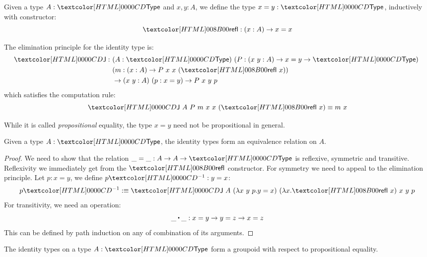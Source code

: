 \begin{definition}
  Given a type $A : \Type$ and $x, y : A$, we define the type
  $x = y : \Type$, inductively with constructor:
  $$
  \refl : (x : A) \to x = x
  $$

  The elimination principle for the identity type is:
  \begin{align*}
  \J : &\ (A : \Type)\ (P : (x\ y : A) \to x = y \to \Type)\ \\
  &\ (m : (x : A) \to P\ x\ x\ (\refl\ x)) \\
  &\ \to (x\ y : A)\ (p : x = y) \to P\ x\ y\ p
  \end{align*}
  which satisfies the computation rule:
  $$
  \J\ A\ P\ m\ x\ x\ (\refl\ x) \defeq m\ x
  $$
\end{definition}

\begin{remark}
  While it is called \emph{propositional} equality, the type $x = y$
  need not be propositional in general.
\end{remark}

\begin{lemma}
  Given a type $A : \Type$, the identity types form an equivalence
  relation on $A$.
\end{lemma}

\begin{proof}
  We need to show that the relation $\_ = \_ : A \to A \to \Type$ is
  reflexive, symmetric and transitive. Reflexivity we immediately get
  from the $\refl$ constructor. For symmetry we need to appeal to the
  elimination principle. Let $p : x = y$, we define $\sym{p} : y = x$:
  $$
  \sym{p} \ddefeq \J\ A\ (\lambda x\ y\ p . y = x)\ (\lambda x . \refl\ x)\ x\ y\ p
  $$
  For transitivity, we need an operation:
  $$
  \trans{\_}{\_} : x = y \to y = z \to x = z
  $$
  This can be defined by path induction on any of combination of its
  arguments.
\end{proof}

\begin{lemma}
  The identity types on a type $A : \Type$ form a groupoid with
  respect to propositional equality.
\end{lemma}


